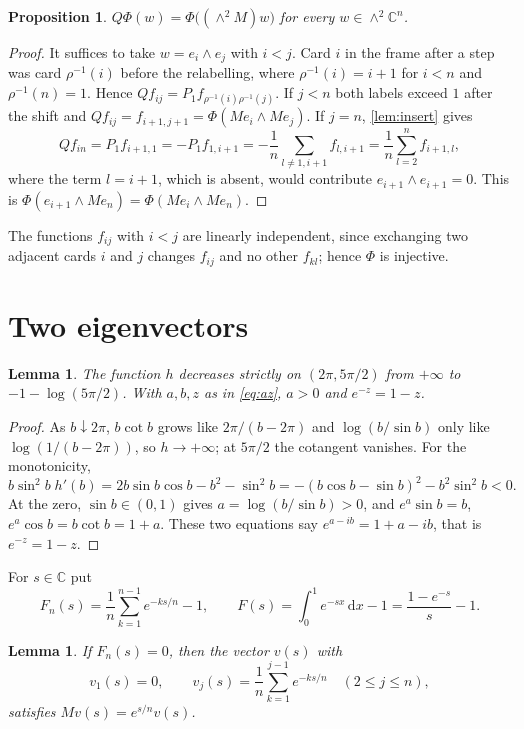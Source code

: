 \documentclass[11pt,a4paper]{article}
\numberwithin{equation}{section}
\newtheorem{lemma}[theorem]{Lemma}
\newtheorem{proposition}[theorem]{Proposition}
\theoremstyle{remark}
\newcommand{\C}{\mathbb C}
\newcommand{\dd}{\,\mathrm d}
\begin{document}
\begin{proposition}\label{prop:wedge}
$Q\Phi(w)=\Phi\bigl((\wedge^2M)w\bigr)$ for every $w\in\wedge^2\C^n$.
\end{proposition}

\begin{proof}
It suffices to take $w=e_i\wedge e_j$ with $i<j$. Card $i$ in the frame after a step was card $\rho^{-1}(i)$ before the relabelling, where $\rho^{-1}(i)=i+1$ for $i<n$ and $\rho^{-1}(n)=1$. Hence $Qf_{ij}=P_1f_{\rho^{-1}(i)\rho^{-1}(j)}$. If $j<n$ both labels exceed $1$ after the shift and $Qf_{ij}=f_{i+1,j+1}=\Phi(Me_i\wedge Me_j)$. If $j=n$, \cref{lem:insert} gives
\[
Qf_{in}=P_1f_{i+1,1}=-P_1f_{1,i+1}=-\frac1n\sum_{l\ne1,i+1}f_{l,i+1}=\frac1n\sum_{l=2}^nf_{i+1,l},
\]
where the term $l=i+1$, which is absent, would contribute $e_{i+1}\wedge e_{i+1}=0$. This is $\Phi(e_{i+1}\wedge Me_n)=\Phi(Me_i\wedge Me_n)$.
\end{proof}

The functions $f_{ij}$ with $i<j$ are linearly independent, since exchanging two adjacent cards $i$ and $j$ changes $f_{ij}$ and no other $f_{kl}$; hence $\Phi$ is injective.

\section{Two eigenvectors}\label{sec:eigen}

\begin{lemma}\label{lem:root}
The function $h$ decreases strictly on $(2\pi,5\pi/2)$ from $+\infty$ to $-1-\log(5\pi/2)$. With $a,b,z$ as in \eqref{eq:az}, $a>0$ and $e^{-z}=1-z$.
\end{lemma}

\begin{proof}
As $b\downarrow2\pi$, $b\cot b$ grows like $2\pi/(b-2\pi)$ and $\log(b/\sin b)$ only like $\log(1/(b-2\pi))$, so $h\to+\infty$; at $5\pi/2$ the cotangent vanishes. For the monotonicity,
\[
b\sin^2b\;h'(b)=2b\sin b\cos b-b^2-\sin^2b=-(b\cos b-\sin b)^2-b^2\sin^2b<0 .
\]
At the zero, $\sin b\in(0,1)$ gives $a=\log(b/\sin b)>0$, and $e^a\sin b=b$, $e^a\cos b=b\cot b=1+a$. These two equations say $e^{a-ib}=1+a-ib$, that is $e^{-z}=1-z$.
\end{proof}

For $s\in\C$ put
\[
F_n(s)=\frac1n\sum_{k=1}^{n-1}e^{-ks/n}-1,\qquad F(s)=\int_0^1e^{-sx}\dd x-1=\frac{1-e^{-s}}s-1 .
\]

\begin{lemma}\label{lem:eigvec}
If $F_n(s)=0$, then the vector $v(s)$ with
\[
v_1(s)=0,\qquad v_j(s)=\frac1n\sum_{k=1}^{j-1}e^{-ks/n}\quad(2\le j\le n),
\]
satisfies $Mv(s)=e^{s/n}v(s)$.
\end{lemma}
\end{document}
